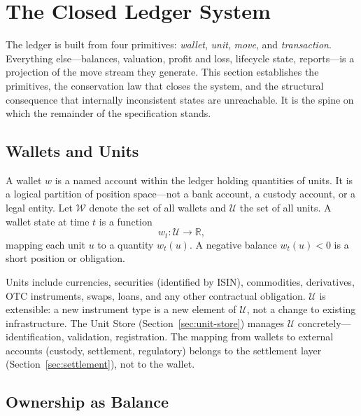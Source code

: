 \section{The Closed Ledger System}
\label{sec:sec02}
\label{sec:ledger}%

The ledger is built from four primitives: \emph{wallet}, \emph{unit}, \emph{move}, and \emph{transaction}. Everything else---balances, valuation, profit and loss, lifecycle state, reports---is a projection of the move stream they generate. This section establishes the primitives, the conservation law that closes the system, and the structural consequence that internally inconsistent states are unreachable. It is the spine on which the remainder of the specification stands.

\subsection{Wallets and Units}

\begin{definition}[Wallet]
A wallet $w$ is a named account within the ledger holding quantities of units. It is a logical partition of position space---not a bank account, a custody account, or a legal entity. Let $\mathcal{W}$ denote the set of all wallets and $\mathcal{U}$ the set of all units. A wallet state at time $t$ is a function
\[
w_t : \mathcal{U} \to \mathbb{R},
\]
mapping each unit $u$ to a quantity $w_t(u)$. A negative balance $w_t(u) < 0$ is a short position or obligation.
\end{definition}

Units include currencies, securities (identified by ISIN), commodities, derivatives, OTC instruments, swaps, loans, and any other contractual obligation. $\mathcal{U}$ is extensible: a new instrument type is a new element of $\mathcal{U}$, not a change to existing infrastructure. The Unit Store (Section~\ref{sec:unit-store}) manages $\mathcal{U}$ concretely---identification, validation, registration. The mapping from wallets to external accounts (custody, settlement, regulatory) belongs to the settlement layer (Section~\ref{sec:settlement}), not to the wallet.

\subsection{Ownership as Balance}

